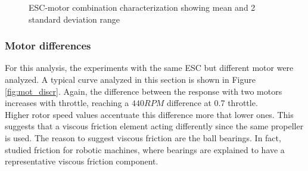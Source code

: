 \begin{figure}[!tbp]
  \centering
  \caption{ESC-motor combination characterization showing mean and 2 standard deviation range}
  \label{fig:esc_mot_stats}
\end{figure}

\subsubsection{Motor differences}
For this analysis, the experiments with the same ESC but different motor were analyzed. A typical curve analyzed in this section is shown in Figure \ref{fig:mot_discr}. Again, the difference between the response with two motors increases with throttle, reaching a $440RPM$ difference at 0.7 throttle. \\

Higher rotor speed values accentuate this difference more that lower ones. This suggests that a viscous friction element acting differently since the same propeller is used. The reason to suggest viscous friction are the ball bearings. In fact, \cite{Armstrong-H1994} studied friction for robotic machines, where bearings are explained to have a representative viscous friction component.\\


